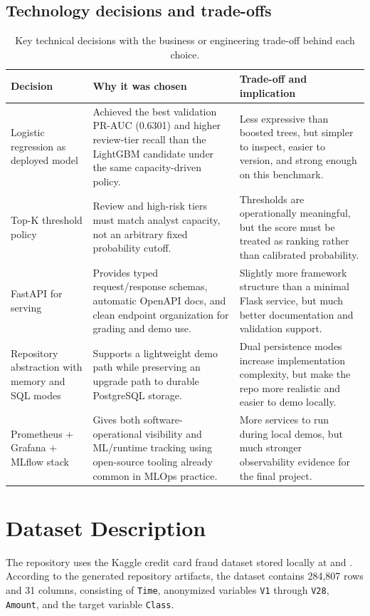 \documentclass[11pt]{article}
\newcommand{\code}[1]{\texttt{#1}}
\begin{document}
\subsection*{Technology decisions and trade-offs}
\begin{table}[H]
\small
\centering
\begin{tabularx}{\textwidth}{p{}p{}X}
\toprule
Decision & Why it was chosen & Trade-off and implication \\
\midrule
Logistic regression as deployed model & Achieved the best validation PR-AUC (0.6301) and higher review-tier recall than the LightGBM candidate under the same capacity-driven policy. & Less expressive than boosted trees, but simpler to inspect, easier to version, and strong enough on this benchmark. \\
Top-K threshold policy & Review and high-risk tiers must match analyst capacity, not an arbitrary fixed probability cutoff. & Thresholds are operationally meaningful, but the score must be treated as ranking rather than calibrated probability. \\
FastAPI for serving & Provides typed request/response schemas, automatic OpenAPI docs, and clean endpoint organization for grading and demo use. & Slightly more framework structure than a minimal Flask service, but much better documentation and validation support. \\
Repository abstraction with memory and SQL modes & Supports a lightweight demo path while preserving an upgrade path to durable PostgreSQL storage. & Dual persistence modes increase implementation complexity, but make the repo more realistic and easier to demo locally. \\
Prometheus + Grafana + MLflow stack & Gives both software-operational visibility and ML/runtime tracking using open-source tooling already common in MLOps practice. & More services to run during local demos, but much stronger observability evidence for the final project. \\
\bottomrule
\end{tabularx}
\caption{Key technical decisions with the business or engineering trade-off behind each choice.}
\end{table}

\section{Dataset Description}
The repository uses the Kaggle credit card fraud dataset stored locally at  and . According to the generated repository artifacts, the dataset contains 284{,}807 rows and 31 columns, consisting of \code{Time}, anonymized variables \code{V1} through \code{V28}, \code{Amount}, and the target variable \code{Class}.
\end{document}
